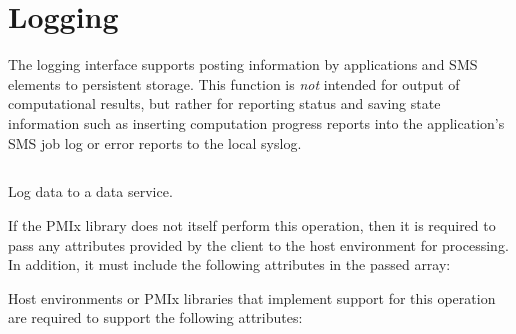 \section{Logging}
\label{chap:api_job_mgmt:logging}

The logging interface supports posting information by applications and SMS elements to persistent storage. This function is \textit{not} intended for output of computational results, but rather for reporting status and saving state information such as inserting computation progress reports into the application's \ac{SMS} job log or error reports to the local syslog.

\subsection{}

\summary

Log data to a data service.

\format


\begin{arglist}
\end{arglist}

\returnsimple

\reqattrstart
If the \ac{PMIx} library does not itself perform this operation, then it is required to pass any attributes provided by the client to the host environment for processing. In addition, it must include the following attributes in the passed  array:


Host environments or \ac{PMIx} libraries that implement support for this operation are required to support the following attributes:



